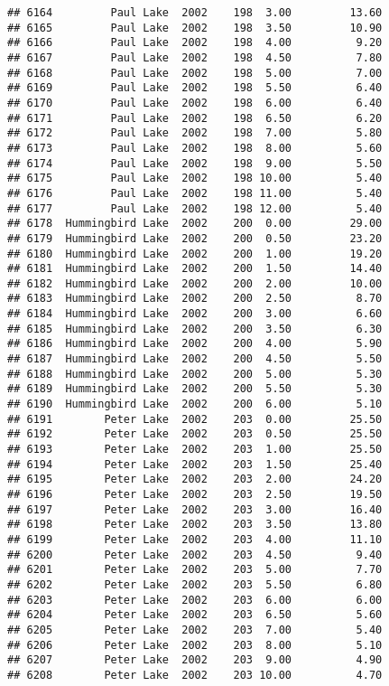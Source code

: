\documentclass[
]{article}
\begin{document}
\begin{verbatim}
## 6164         Paul Lake  2002    198  3.00         13.60
## 6165         Paul Lake  2002    198  3.50         10.90
## 6166         Paul Lake  2002    198  4.00          9.20
## 6167         Paul Lake  2002    198  4.50          7.80
## 6168         Paul Lake  2002    198  5.00          7.00
## 6169         Paul Lake  2002    198  5.50          6.40
## 6170         Paul Lake  2002    198  6.00          6.40
## 6171         Paul Lake  2002    198  6.50          6.20
## 6172         Paul Lake  2002    198  7.00          5.80
## 6173         Paul Lake  2002    198  8.00          5.60
## 6174         Paul Lake  2002    198  9.00          5.50
## 6175         Paul Lake  2002    198 10.00          5.40
## 6176         Paul Lake  2002    198 11.00          5.40
## 6177         Paul Lake  2002    198 12.00          5.40
## 6178  Hummingbird Lake  2002    200  0.00         29.00
## 6179  Hummingbird Lake  2002    200  0.50         23.20
## 6180  Hummingbird Lake  2002    200  1.00         19.20
## 6181  Hummingbird Lake  2002    200  1.50         14.40
## 6182  Hummingbird Lake  2002    200  2.00         10.00
## 6183  Hummingbird Lake  2002    200  2.50          8.70
## 6184  Hummingbird Lake  2002    200  3.00          6.60
## 6185  Hummingbird Lake  2002    200  3.50          6.30
## 6186  Hummingbird Lake  2002    200  4.00          5.90
## 6187  Hummingbird Lake  2002    200  4.50          5.50
## 6188  Hummingbird Lake  2002    200  5.00          5.30
## 6189  Hummingbird Lake  2002    200  5.50          5.30
## 6190  Hummingbird Lake  2002    200  6.00          5.10
## 6191        Peter Lake  2002    203  0.00         25.50
## 6192        Peter Lake  2002    203  0.50         25.50
## 6193        Peter Lake  2002    203  1.00         25.50
## 6194        Peter Lake  2002    203  1.50         25.40
## 6195        Peter Lake  2002    203  2.00         24.20
## 6196        Peter Lake  2002    203  2.50         19.50
## 6197        Peter Lake  2002    203  3.00         16.40
## 6198        Peter Lake  2002    203  3.50         13.80
## 6199        Peter Lake  2002    203  4.00         11.10
## 6200        Peter Lake  2002    203  4.50          9.40
## 6201        Peter Lake  2002    203  5.00          7.70
## 6202        Peter Lake  2002    203  5.50          6.80
## 6203        Peter Lake  2002    203  6.00          6.00
## 6204        Peter Lake  2002    203  6.50          5.60
## 6205        Peter Lake  2002    203  7.00          5.40
## 6206        Peter Lake  2002    203  8.00          5.10
## 6207        Peter Lake  2002    203  9.00          4.90
## 6208        Peter Lake  2002    203 10.00          4.70

\end{verbatim}
\end{document}
